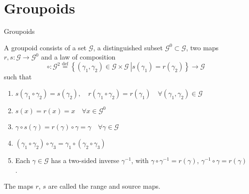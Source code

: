 \documentclass{beamer}
\theoremstyle{plain}
\newcommand{\G}{\mathcal{G}}
\newcommand{\ga}{\gamma}
\newcommand{\bydef}{\stackrel{\mathrm{def}}{=}}
\begin{document}
\section{Groupoids}

\begin{frame}
\huge {Groupoids} \normalsize\\	
\begin{definition}

	A \alert{groupoid} consists of a set $\G$, a distinguished subset $\G^0\subset\G$, two maps
	$r, s : \G\to \G^0$ and a law of composition
	$$
	\circ: \G^2\bydef\left\{\left.\left(\ga_1,\ga_2 \right) \in \G\times\G~\right| s\left(\ga_1\right)= r\left(\ga_2\right)\right\}\to \G
	$$
	such that
	\begin{enumerate}
		\item $s\left(\ga_1\circ\ga_2\right)=s\left(\ga_2\right), \quad r\left(\ga_1\circ\ga_2\right)=r\left(\ga_1\right)\quad \forall\left(\ga_1, \ga_2 \right) \in \G$
		\item $s\left(x\right)=r\left(x\right)=x \quad\forall x\in\G^0$
		\item $\ga\circ s\left(\ga\right)= r\left(\ga\right)\circ\ga = \ga\quad \forall\ga\in\G$
		\item $\left( \ga_1\circ\ga_2\right) \circ\ga_3=\ga_1\circ\left( \ga_2\circ\ga_3\right) $
		\item Each $\ga \in\G$ has a two-sided inverse $\ga^{-1}$, with $\ga\circ\ga^{-1}=r\left(\ga\right)$, $\ga^{-1}\circ\ga=r\left(\ga\right)$.
	\end{enumerate}
	The maps $r$, $s$ are called the \alert{range} and \alert{source} maps.
\end{definition}

\end{frame}
\end{document}
